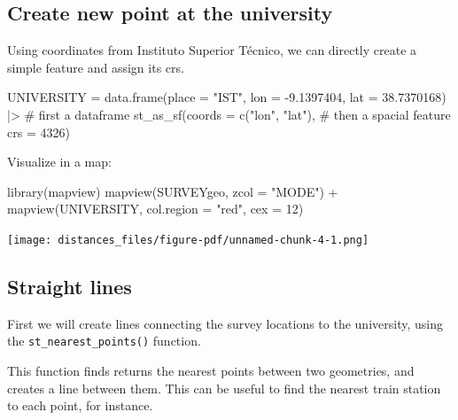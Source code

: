 \documentclass[
  letterpaper,
  DIV=11,
  numbers=noendperiod]{scrreprt}
\newenvironment{Shaded}{\begin{snugshade}}{\end{snugshade}}
\newcommand{\AttributeTok}[1]{\textcolor[rgb]{0.40,0.45,0.13}{#1}}
\newcommand{\CommentTok}[1]{\textcolor[rgb]{0.37,0.37,0.37}{#1}}
\newcommand{\DecValTok}[1]{\textcolor[rgb]{0.68,0.00,0.00}{#1}}
\newcommand{\FloatTok}[1]{\textcolor[rgb]{0.68,0.00,0.00}{#1}}
\newcommand{\FunctionTok}[1]{\textcolor[rgb]{0.28,0.35,0.67}{#1}}
\newcommand{\NormalTok}[1]{\textcolor[rgb]{0.00,0.23,0.31}{#1}}
\newcommand{\OtherTok}[1]{\textcolor[rgb]{0.00,0.23,0.31}{#1}}
\newcommand{\SpecialCharTok}[1]{\textcolor[rgb]{0.37,0.37,0.37}{#1}}
\newcommand{\StringTok}[1]{\textcolor[rgb]{0.13,0.47,0.30}{#1}}
\begin{document}
\subsection{Create new point at the
university}\label{create-new-point-at-the-university}

Using coordinates from Instituto Superior Técnico, we can directly
create a simple feature and assign its crs.

\begin{Shaded}
\begin{Highlighting}[]
\NormalTok{UNIVERSITY }\OtherTok{=} \FunctionTok{data.frame}\NormalTok{(}\AttributeTok{place =} \StringTok{"IST"}\NormalTok{,}
                        \AttributeTok{lon =} \SpecialCharTok{{-}}\FloatTok{9.1397404}\NormalTok{,}
                        \AttributeTok{lat =} \FloatTok{38.7370168}\NormalTok{) }\SpecialCharTok{|\textgreater{}}  \CommentTok{\# first a dataframe}
  \FunctionTok{st\_as\_sf}\NormalTok{(}\AttributeTok{coords =} \FunctionTok{c}\NormalTok{(}\StringTok{"lon"}\NormalTok{, }\StringTok{"lat"}\NormalTok{), }\CommentTok{\# then a spacial feature}
           \AttributeTok{crs =} \DecValTok{4326}\NormalTok{)}
\end{Highlighting}
\end{Shaded}

Visualize in a map:

\begin{Shaded}
\begin{Highlighting}[]
\FunctionTok{library}\NormalTok{(mapview)}
\FunctionTok{mapview}\NormalTok{(SURVEYgeo, }\AttributeTok{zcol =} \StringTok{"MODE"}\NormalTok{) }\SpecialCharTok{+} \FunctionTok{mapview}\NormalTok{(UNIVERSITY, }\AttributeTok{col.region =} \StringTok{"red"}\NormalTok{, }\AttributeTok{cex =} \DecValTok{12}\NormalTok{)}
\end{Highlighting}
\end{Shaded}

\texttt{[image: distances\_files/figure-pdf/unnamed-chunk-4-1.png]}

\subsection{Straight lines}\label{straight-lines}

First we will create lines connecting the survey locations to the
university, using the \texttt{st\_nearest\_points()} function.

This function finds returns the nearest points between two geometries,
and creates a line between them. This can be useful to find the nearest
train station to each point, for instance.
\end{document}

